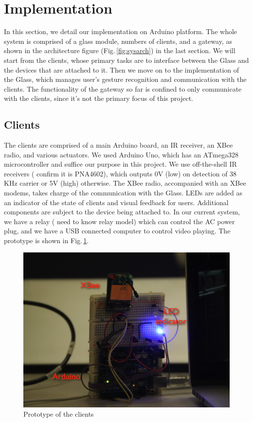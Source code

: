 \section{Implementation}
\label{sec:implementation}

In this section, we detail our implementation on Arduino \cite{Arduino} platform. The whole system is comprised of a glass module, numbers of clients, and a gateway, as shown in the architecture figure (Fig.\,\ref{fig:sysarch}) in the last section. We will start from the clients, whose primary tasks are to interface between the Glass and the devices that are attached to it. Then we move on to the implementation of the Glass, which manages user's gesture recognition and communication with the clients. The functionality of the gateway so far is confined to only communicate with the clients, since it's not the primary focus of this project.

\subsection{Clients}
The clients are comprised of a main Arduino board, an IR receiver, an XBee radio, and various actuators. We used Arduino Uno, which has an ATmega328 microcontroller and suffice our purpose in this project. We use off-the-shell IR receivers ({\color{red} confirm it is PNA4602}), which outputs 0V (low) on detection of 38 KHz carrier or 5V (high) otherwise. The XBee radio, accompanied with an XBee modems, takes charge of the communication with the Glass. LEDs are added as an indicator of the state of clients and visual feedback for users. Additional components are subject to the device being attached to. In our current system, we have a relay ({\color{red} need to know relay model}) which can control the AC power plug, and we have a USB connected computer to control video playing. The prototype is shown in Fig.\,\ref{fig:client}.

\begin{figure}
  \centering
  \includegraphics[width=\linewidth]{../figs/client.png}
  \caption{Prototype of the clients}
  \label{fig:client}
\end{figure}

